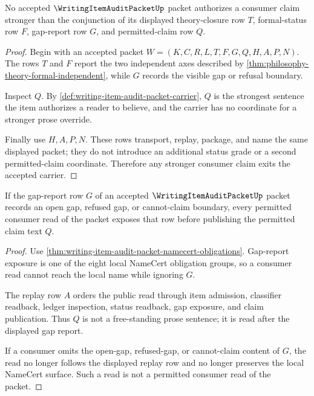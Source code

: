 \begin{theorem}
\label{thm:writing-item-audit-packet-closure-bound}
No accepted $\WritingItemAuditPacketUp$ packet authorizes a consumer claim stronger than the conjunction of its displayed theory-closure row $T$, formal-status row $F$, gap-report row $G$, and permitted-claim row $Q$.
\end{theorem}
\begin{proof}
Begin with an accepted packet $W=(K,C,R,L,T,F,G,Q,H,A,P,N)$. The rows $T$ and $F$ report the two independent axes described by \autoref{thm:philosophy-theory-formal-independent}, while $G$ records the visible gap or refusal boundary.

Inspect $Q$. By \autoref{def:writing-item-audit-packet-carrier}, $Q$ is the strongest sentence the item authorizes a reader to believe, and the carrier has no coordinate for a stronger prose override.

Finally use $H,A,P,N$. These rows transport, replay, package, and name the same displayed packet; they do not introduce an additional status grade or a second permitted-claim coordinate. Therefore any stronger consumer claim exits the accepted carrier.
\end{proof}

\begin{theorem}
\label{thm:writing-item-audit-packet-gap-exposure}
If the gap-report row $G$ of an accepted $\WritingItemAuditPacketUp$ packet records an open gap, refused gap, or cannot-claim boundary, every permitted consumer read of the packet exposes that row before publishing the permitted claim text $Q$.
\end{theorem}
\begin{proof}
Use \autoref{thm:writing-item-audit-packet-namecert-obligations}. Gap-report exposure is one of the eight local NameCert obligation groups, so a consumer read cannot reach the local name while ignoring $G$.

The replay row $A$ orders the public read through item admission, classifier readback, ledger inspection, status readback, gap exposure, and claim publication. Thus $Q$ is not a free-standing prose sentence; it is read after the displayed gap report.

If a consumer omits the open-gap, refused-gap, or cannot-claim content of $G$, the read no longer follows the displayed replay row and no longer preserves the local NameCert surface. Such a read is not a permitted consumer read of the packet.
\end{proof}

